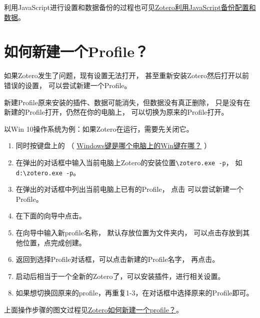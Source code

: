 \documentclass[cn,11pt,chinese]{elegantbook}
\begin{document}
					利用JavaScript进行设置和数据备份的过程也可见\href{https://zhuanlan.zhihu.com/p/357859432}
					{Zotero利用JavaScript备份配置和数据}。


	\section{如何新建一个Profile？} \label{sec:creatProfile}
		如果Zotero发生了问题，现有设置无法打开，
		甚至重新安装Zotero然后打开以前错误的设置，
		可以尝试新建一个Profile。
			\begin{note}
				新建Profile原来安装的插件、数据可能消失，但数据没有真正删除，
				只是没有在新建的Profile打开，仍然在你的电脑上，
				可以切换为原来的Profile打开。
			\end{note}
		以Win 10操作系统为例：如果Zotero在运行，需要先关闭它。
		\begin{enumerate}
			\item 同时按键盘上的
				（
				\href{https://product.pconline.com.cn/itbk/software/dnwt/1601/7475121.html}{Windows键是哪个电脑上的Win键在哪？} ）
			\item 在弹出的对话框中输入当前电脑上Zotero的安装位置\verb|\zotero.exe -p|，
			如\verb|d:\zotero.exe -p|。
			\item 在弹出的对话框中列出当前电脑上已有的Profile，
				点击 可以尝试新建一个Profile。
			\item 在下面的向导中点击。
			\item 在向导中输入新profile名称，
				默认存放位置为文件夹内，
				可以点击存放到其他位置，点完成创建。
			\item 返回到选择Profile对话框，可以点击新建的Profile名字，
			再点击。
			\item 启动后相当于一个全新的Zotero了，可以安装插件，进行相关设置。
			\item 如果想切换回原来的profile，再重复1-3，在对话框中选择原来的Profile即可。
		\end{enumerate}
		上面操作步骤的图文过程见\href{https://zhuanlan.zhihu.com/p/404906012}{Zotero如何新建一个profile？}。
	
\end{document}
